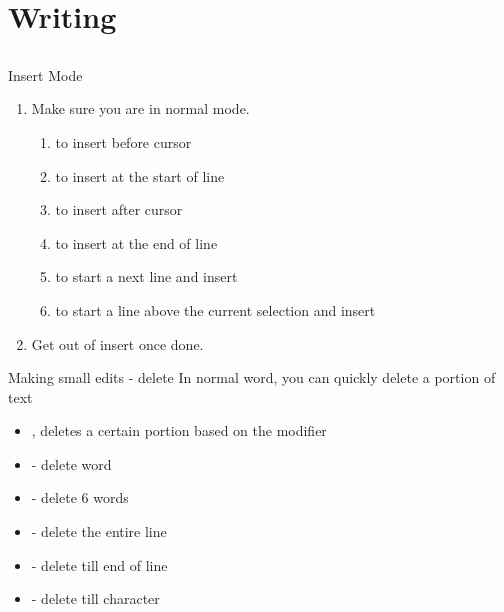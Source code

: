 \documentclass[12pt]{beamer}
\begin{document}
\section{Writing}
\subsection{}

\begin{frame}{Insert Mode}
    \begin{enumerate}
        \item Make sure you are in normal mode. 
              \begin{enumerate}
                  \item {} to insert before cursor
                  \item {} to insert at the start of line
                  \item {} to insert after cursor
                  \item {} to insert at the end of line
                  \item {} to start a next line and insert
                  \item {} to start a line above the current selection and insert
              \end{enumerate}{}
        \item Get out of insert once done. 
    \end{enumerate}{}
\end{frame}{}

\begin{frame}{Making small edits - delete}
    In normal word, you can quickly delete a portion of text
    \begin{itemize}
        \item {}, deletes a certain portion based on the modifier
        \item {} - delete word
        \item {} - delete 6 words
        \item {} - delete the entire line
        \item {} - delete till end of line
        \item {} - delete till character
    \end{itemize}{}
\end{frame}{}
\end{document}

